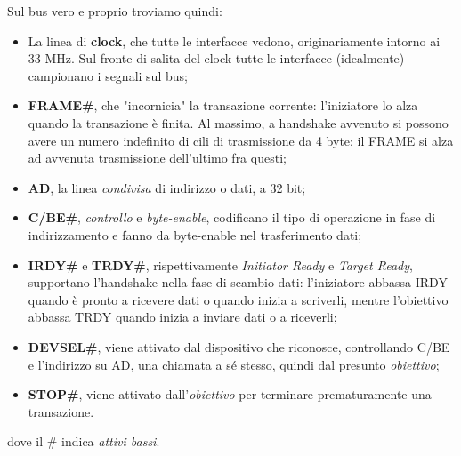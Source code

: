 \documentclass[a4paper,11pt]{article}
\begin{document}
Sul bus vero e proprio troviamo quindi:
\begin{itemize}
	\item La linea di \textbf{clock}, che tutte le interfacce vedono, originariamente intorno ai 33 MHz.
		Sul fronte di salita del clock tutte le interfacce (idealmente) campionano i segnali sul bus;
	\item \textbf{FRAME\#}, che "incornicia" la transazione corrente: l'iniziatore lo alza quando la transazione è finita. Al massimo, a handshake avvenuto si possono avere un numero indefinito di cili di trasmissione da 4 byte: il FRAME si alza ad avvenuta trasmissione dell'ultimo fra questi;
	\item \textbf{AD}, la linea \textit{condivisa} di indirizzo o dati, a 32 bit;
	\item \textbf{C/BE\#}, \textit{controllo} e \textit{byte-enable}, codificano il tipo di operazione in fase di indirizzamento e fanno da byte-enable nel trasferimento dati;
	\item \textbf{IRDY\#} e \textbf{TRDY\#}, rispettivamente \textit{Initiator Ready} e \textit{Target Ready}, supportano l'handshake nella fase di scambio dati: l'iniziatore abbassa IRDY quando è pronto a ricevere dati o quando inizia a scriverli, mentre l'obiettivo abbassa TRDY quando inizia a inviare dati o a riceverli;
	\item \textbf{DEVSEL\#}, viene attivato dal dispositivo che riconosce, controllando C/BE e l'indirizzo su AD, una chiamata a sé stesso, quindi dal presunto \textit{obiettivo}; 
	\item \textbf{STOP\#}, viene attivato dall'\textit{obiettivo} per terminare prematuramente una transazione.
\end{itemize}
dove il \# indica \textit{attivi bassi}.

\newpage
\end{document}
